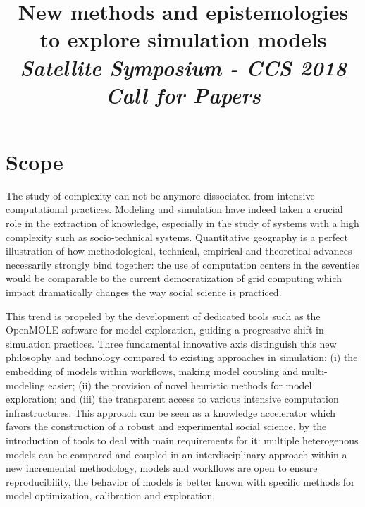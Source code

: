 \documentclass[11pt]{article}
\begin{document}
\title{\vspace{-2cm}New methods and epistemologies to explore simulation models
\medskip\\
\textit{Satellite Symposium - CCS 2018}\medskip\\
\textit{Call for Papers}
}

\date{}

\maketitle

\justify




\section*{Scope}

The study of complexity can not be anymore dissociated from intensive computational practices. Modeling and simulation have indeed taken a crucial role in the extraction of knowledge, especially in the study of systems with a high complexity such as socio-technical systems. Quantitative geography is a perfect illustration of how methodological, technical, empirical and theoretical advances necessarily strongly bind together: the use of computation centers in the seventies would be comparable to the current democratization of grid computing which impact dramatically changes the way social science is practiced. 

This trend is propeled by the development of dedicated tools such as the OpenMOLE software for model exploration, guiding a progressive shift in simulation practices. Three fundamental innovative axis distinguish this new philosophy and technology compared to existing approaches in simulation: (i) the embedding of models within workflows, making model coupling and multi-modeling easier; (ii) the provision of novel heuristic methods for model exploration; and (iii) the transparent access to various intensive computation infrastructures. This approach can be seen as a knowledge accelerator which favors the construction of a robust and experimental social science, by the introduction of tools to deal with main requirements for it: multiple heterogenous models can be compared and coupled in an interdisciplinary approach within a new incremental methodology, models and workflows are open to ensure reproducibility, the behavior of models is better known with specific methods for model optimization, calibration and exploration. 
\end{document}

